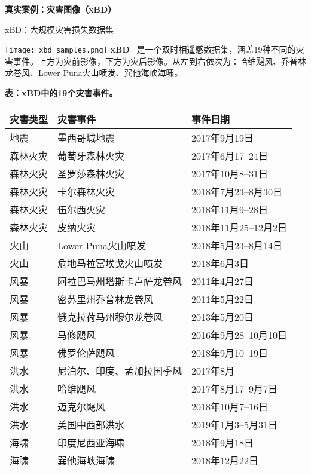 \begin{frame}
  \centering
  \vspace{2.5cm}
  {\LARGE \textbf{真实案例：灾害图像（xBD）}}
\end{frame}

\begin{refsection}
  \begin{frame}{xBD：大规模灾害损失数据集}
    \begin{minipage}{0.42\linewidth}
      \centering
      \texttt{[image: xbd\_samples.png]}
      \vspace{0.5em}
      \scriptsize
      \textbf{xBD}~\parencite{guptaCreatingXBDDataset2019} 是一个双时相遥感数据集，涵盖19种不同的灾害事件。上方为灾前影像，下方为灾后影像。从左到右依次为：哈维飓风、乔普林龙卷风、Lower Puna火山喷发、巽他海峡海啸。
    \end{minipage}%
    \hfill
    \begin{minipage}{0.55\linewidth}
      \tiny
      \centering
      \textbf{表：xBD中的19个灾害事件。}
      \begin{tabular}{lll}
        \hline
        \textbf{灾害类型} & \textbf{灾害事件} & \textbf{事件日期} \\
        \hline
        地震 & 墨西哥城地震 & 2017年9月19日 \\
        森林火灾 & 葡萄牙森林火灾 & 2017年6月17--24日 \\
        森林火灾 & 圣罗莎森林火灾 & 2017年10月8--31日 \\
        森林火灾 & 卡尔森林火灾 & 2018年7月23--8月30日 \\
        森林火灾 & 伍尔西火灾 & 2018年11月9--28日 \\
        森林火灾 & 皮纳火灾 & 2018年11月25--12月2日 \\
        火山 & Lower Puna火山喷发 & 2018年5月23--8月14日 \\
        火山 & 危地马拉富埃戈火山喷发 & 2018年6月3日 \\
        风暴 & 阿拉巴马州塔斯卡卢萨龙卷风 & 2011年4月27日 \\
        风暴 & 密苏里州乔普林龙卷风 & 2011年5月22日 \\
        风暴 & 俄克拉荷马州穆尔龙卷风 & 2013年5月20日 \\
        风暴 & 马修飓风 & 2016年9月28--10月10日 \\
        风暴 & 佛罗伦萨飓风 & 2018年9月10--19日 \\
        洪水 & 尼泊尔、印度、孟加拉国季风 & 2017年8月 \\
        洪水 & 哈维飓风 & 2017年8月17--9月7日 \\
        洪水 & 迈克尔飓风 & 2018年10月7--16日 \\
        洪水 & 美国中西部洪水 & 2019年1月3--5月31日 \\
        海啸 & 印度尼西亚海啸 & 2018年9月18日 \\
        海啸 & 巽他海峡海啸 & 2018年12月22日 \\
        \hline
      \end{tabular}
      \vspace{0.5em}


\end{minipage}
\end{frame}
\end{refsection}
